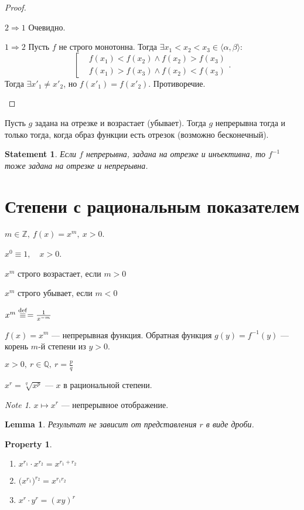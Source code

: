 \documentclass[11pt]{book}
\newcommand{\Z}{\mathbb{Z}}
\newcommand{\Q}{\mathbb{Q}}
\theoremstyle{definition}
\theoremstyle{plain}
\theoremstyle{plain}
\newtheorem*{lm}{Lemma}
\newtheorem*{st}{Statement}
\newtheorem*{prop}{Property}
\theoremstyle{definition}
\theoremstyle{remark}
\newtheorem*{note}{Note}
\begin{document}
\begin{proof}
    $ $
    \begin{description}
	\item $ \boxed{ 2 \Longrightarrow 1}$ Очевидно.
	\item $ \boxed{1 \Longrightarrow 2}$  Пусть  $ f$ не строго монотонна. Тогда $ \exists x_1 <x_2<x_3 \in \langle \alpha, \beta \rangle$:
	    \[
		\left[
		    \begin{aligned}
		& f(x_1) < f(x_2) \wedge f(x_2) > f(x_3)\\
		& f(x_1) > f(x_3) \wedge f(x_2) < f(x_3)
		    \end{aligned}
		\right.
	    .\]
	    Тогда $ \exists x'_1 \ne  x'_2$, но $ f(x'_1) = f(x'_2)$. Противоречие.
    \end{description}
\end{proof}
\begin{thm}
    Пусть $ g$ задана на отрезке и возрастает (убывает). Тогда  $ g$ непрерывна тогда и только тогда, когда образ функции есть отрезок (возможно бесконечный).
\end{thm}
\begin{st}
    Если  $ f$ непрерывна, задана на отрезке и инъективна, то $ f^{-1}$ тоже задана на отрезке и непрерывна.
\end{st}
\section{Степени с рациональным показателем}
$ m \in \Z, ~ f(x) = x^{m}, ~ x >0$.

$ x^{0} \equiv  1, \quad x >0$.

$ x^{m}$ строго возрастает, если $ m >0$

$ x^{m}$ строго убывает, если $ m <0$

$ x^{m} \mathrel{\stackrel{\rm def}\equiv }  = \frac{1}{x^{-m}}$

$ f(x) = x^{m}$ --- непрерывная функция.
Обратная функция $ g(y) = f^{-1}(y) $ --- корень $ m$-й степени из $ y>0$.
\begin{defn}
    $ x >0, ~ r \in \Q, ~ r = \frac{p}{q}$

    $ x^{r} = \sqrt[q]{x ^{p}}$ --- $ x$ в рациональной степени.
\end{defn}
\begin{note}
    $ x \mapsto x^{r}$ --- непрерывное отображение.
\end{note}
\begin{lm}
    Результат не зависит от представления $ r$ в виде дроби.
\end{lm}
\begin{prop}
    $ $
    \begin{enumerate}
	\item $ x^{r_1} \cdot x^{r_2} = x^{r_1+r_2}$
	\item $ \bigl(x^{r_1}\bigr)^{r_2}  = x^{r_1r_2}$
	\item $ x^{r} \cdot y^{r} = (xy)^{r}$
    \end{enumerate}
\end{prop}
\end{document}
